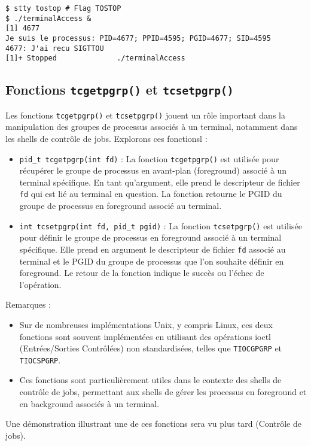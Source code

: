 \begin{lstlisting}[style=blackstyle]
$ stty tostop # Flag TOSTOP
$ ./terminalAccess &
[1] 4677
Je suis le processus: PID=4677; PPID=4595; PGID=4677; SID=4595
4677: J'ai recu SIGTTOU
[1]+ Stopped              ./terminalAccess
\end{lstlisting}

\subsection{Fonctions \texttt{tcgetpgrp()} et \texttt{tcsetpgrp()}}

Les fonctions \texttt{tcgetpgrp()} et \texttt{tcsetpgrp()} jouent un rôle important dans la manipulation des groupes de processus associés à un terminal, notamment dans les shells de contrôle de jobs. Explorons ces fonctionsl :

\begin{itemize}
    \item \texttt{pid\_t tcgetpgrp(int fd)} : La fonction \texttt{tcgetpgrp()} est utilisée pour récupérer le groupe de processus en avant-plan (foreground) associé à un terminal spécifique. En tant qu'argument,
 elle prend le descripteur de fichier \texttt{fd} qui est lié au terminal en question. La fonction retourne le PGID du groupe de processus en foreground associé au terminal.

    \item \texttt{int tcsetpgrp(int fd, pid\_t pgid)} : La fonction \texttt{tcsetpgrp()} est utilisée pour définir le groupe de processus en foreground associé à un terminal spécifique. Elle prend en argument le descripteur de fichier \texttt{fd} associé
 au terminal et le PGID du groupe de processus que l'on souhaite définir en foreground. Le retour de la fonction indique le succès ou l'échec de l'opération.
\end{itemize}

Remarques :
\begin{itemize}
    \item Sur de nombreuses implémentations Unix, y compris Linux, ces deux fonctions sont souvent implémentées en utilisant des opérations ioctl (Entrées/Sorties Contrôlées) non standardisées, telles que \texttt{TIOCGPGRP} et \texttt{TIOCSPGRP}.
    \item Ces fonctions sont particulièrement utiles dans le contexte des shells de contrôle de jobs, permettant aux shells de gérer les processus en foreground et en background associés à un terminal.
\end{itemize}

Une démonstration illustrant une de ces fonctions sera vu plus tard (Contrôle de jobs).



